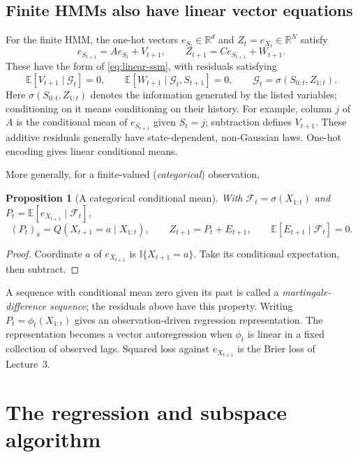 \documentclass[11pt,twoside]{article}
\newcommand{\R}{\mathbb R}
\newcommand{\E}{\mathbb E}
\newcommand{\I}{\mathbb I}
\newtheorem{proposition}[theorem]{Proposition}
\theoremstyle{definition}
\theoremstyle{remark}
\begin{document}
\subsection{Finite HMMs also have linear vector equations}
\label{sec:vector-bridge}

For the finite HMM, the one-hot vectors \(e_{S_t}\in\R^d\) and
\(Z_t=e_{X_t}\in\R^N\) satisfy
\[
 e_{S_{t+1}}=Ae_{S_t}+V_{t+1},\qquad
 Z_{t+1}=Ce_{S_{t+1}}+W_{t+1}.
\]
These have the form of \cref{eq:linear-ssm}, with residuals satisfying
\begin{equation}
 \E[V_{t+1}\mid\mathcal G_t]=0,\qquad
 \E[W_{t+1}\mid\mathcal G_t,S_{t+1}]=0,\qquad
 \mathcal G_t=\sigma(S_{0:t},Z_{1:t}).
 \label{eq:hmm-noise}
\end{equation}
Here \(\sigma(S_{0:t},Z_{1:t})\) denotes the information generated by
the listed variables; conditioning on it means conditioning on their history.
For example, column \(j\) of \(A\) is the conditional mean of
\(e_{S_{t+1}}\) given \(S_t=j\); subtraction defines \(V_{t+1}\).
These additive residuals generally have state-dependent, non-Gaussian
laws. One-hot encoding gives linear conditional means.

More generally, for a finite-valued (\emph{categorical}) observation,
\begin{proposition}[A categorical conditional mean]
\label{prop:one-hot}
With \(\mathcal F_t=\sigma(X_{1:t})\) and
\(P_t=\E[e_{X_{t+1}}\mid\mathcal F_t]\),
\[
 (P_t)_a=Q(X_{t+1}=a\mid X_{1:t}),\qquad
 Z_{t+1}=P_t+E_{t+1},\qquad
 \E[E_{t+1}\mid\mathcal F_t]=0.
\]
\end{proposition}
\begin{proof}
Coordinate \(a\) of \(e_{X_{t+1}}\) is \(\I\{X_{t+1}=a\}\).
Take its conditional expectation, then subtract.
\end{proof}
A sequence with conditional mean zero given its past is called a
\emph{martingale-difference sequence}; the residuals above have this property.
Writing \(P_t=\phi_t(X_{1:t})\) gives an observation-driven regression
representation. The representation becomes a vector autoregression when
$\phi_t$ is linear in a fixed collection of observed lags.
Squared loss against \(e_{X_{t+1}}\) is the Brier loss of Lecture~3.

\section{The regression and subspace algorithm}
\label{sec:subspace-algorithm}
\end{document}
